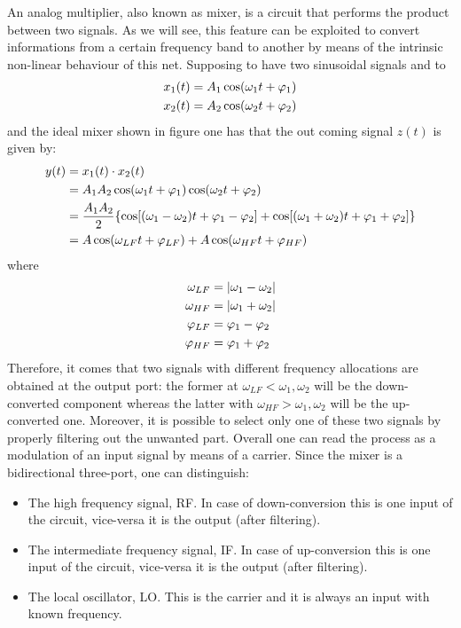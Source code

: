 An analog multiplier, also known as mixer, is a circuit that performs the product between two signals. As we will see, this feature can be exploited to convert informations from a certain frequency band to another by means of the intrinsic non-linear behaviour of this net. Supposing to have two sinusoidal signals and to 
\begin{align}
x_1(t) &= A_1 \cos(\omega_1 t + \varphi_1) \notag \\
x_2(t) &= A_2 \cos(\omega_2 t + \varphi_2) \notag
\end{align}
and the ideal mixer shown in figure %
one has that the out coming signal $z(t)$ is given by:
\begin{align}
y(t)& =x_1(t)\cdot x_2(t)   \notag \\
& = A_1 A_2 \cos(\omega_1 t + \varphi_1) \cos(\omega_2 t + \varphi_2) \notag \\
& = \frac{A_1 A_2}{2} \{\cos[(\omega_1-\omega_2) t + \varphi_1-\varphi_2]+ \cos[(\omega_1+\omega_2) t +\varphi_1+ \varphi_2]\} \notag \\
& = A \cos(\omega_{LF} t + \varphi_{LF}) + A \cos(\omega_{HF} t + \varphi_{HF}) \notag
\end{align}
where
\begin{align}
\omega_{LF}&= |\omega_1-\omega_2| \notag \\
\omega_{HF}&= |\omega_1+\omega_2| \notag \\
\varphi_{LF} &= \varphi_1-\varphi_2 \notag \\
\varphi_{HF} &= \varphi_1+\varphi_2 \notag 
\end{align}
Therefore, it comes that two signals with different frequency allocations are obtained at the output port: the former at $\omega_{LF}<\omega_1,\omega_2$ will be the down-converted component whereas the latter with $\omega_{HF}>\omega_1,\omega_2$ will be the up-converted one.  Moreover, it is possible to select only one of these two signals by properly filtering out the unwanted part.
Overall one can read the process as a modulation of an input signal by means of a carrier.  Since the mixer is a bidirectional three-port, one can distinguish: 
\begin{itemize}
	\item The high frequency signal, RF. In case of down-conversion this is one input of the circuit, vice-versa it is the output (after filtering).
	\item The intermediate frequency signal, IF. In case of up-conversion this is one input of the circuit, vice-versa it is the output (after filtering).
	\item The local oscillator, LO. This is the carrier and it is always an input with known frequency.
\end{itemize}

